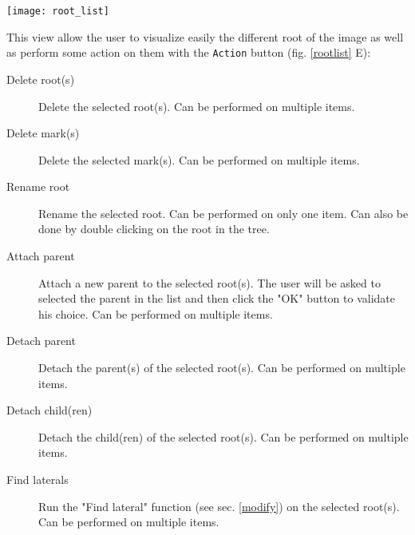 \documentclass[a4paper,english,10pt]{report}
\begin{document}
\begin{SCfigure}[][h]
\texttt{[image: root\_list]}
\caption[Root list]{\textbf{Root list}. 
\\ \\ \textbf{A} List of primary roots shown in yellow.\\ \textbf{B} If a root has children, they will be shown in green.\\ \textbf{C} The right shows information about the selected root(s). \\ \textbf{D} The bottom panel shows the marks of the selected root.\\ \textbf{E} Action menu to perform actions on the selected root(s).\\ \textbf{F} Apply button to validate the action chosen.\\ \textbf{G} Refresh button to refresh the root list (not done automatically)}
\label{rootlist}
\end{SCfigure}

\vspace{20pt}
This view allow the user to visualize easily the different root of the image as well as perform some action on them with the \verb|Action| button (fig. \ref{rootlist} E):

\begin{description}

\item [Delete root(s)] Delete the selected root(s). Can be performed on multiple items.

\item [Delete mark(s)] Delete the selected mark(s). Can be performed on multiple items.

\item [Rename root] Rename the selected root. Can be performed on only one item. Can also be done by double clicking on the root in the tree.

\item [Attach parent] Attach a new parent to the selected root(s). The user will be asked to selected the parent in the list and then click the "OK" button to validate his choice. Can be performed on multiple items.

\item[Detach parent] Detach the parent(s) of the selected root(s). Can be performed on multiple items. 

\item[Detach child(ren)] Detach the child(ren) of the selected root(s). Can be performed on multiple items. 

\item[Find laterals] Run the "Find lateral" function (see sec. \ref{modify}) on the selected root(s). Can be performed on multiple items. 

\end{description}
\end{document}
